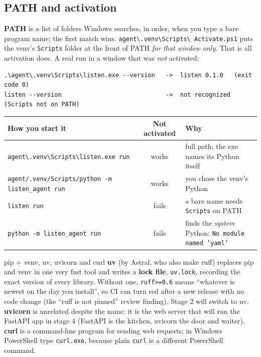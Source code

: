 \documentclass[11pt,a4paper]{article}
\begin{document}
\subsection{PATH and activation}
\textbf{PATH} is a list of folders Windows searches, in order, when you type a bare program name;
the first match wins. \texttt{agent\textbackslash .venv\textbackslash Scripts\textbackslash
Activate.ps1} puts the venv's \texttt{Scripts} folder at the front of PATH \emph{for that window
only}. That is all activation does. A real run in a window that was \emph{not} activated:
\begin{lstlisting}
.\agent\.venv\Scripts\listen.exe --version   ->  listen 0.1.0   (exit code 0)
listen --version                             ->  not recognized (Scripts not on PATH)
\end{lstlisting}
\begin{center}
\begin{tabularx}{\textwidth}{l c X}
\toprule
\textbf{How you start it} & \textbf{Not activated} & \textbf{Why} \\
\midrule
\texttt{agent\textbackslash .venv\textbackslash Scripts\textbackslash listen.exe run} & works & full path; the exe names its Python itself \\
\texttt{agent/.venv/Scripts/python -m listen\_agent run} & works & you chose the venv's Python \\
\texttt{listen run} & fails & a bare name needs \texttt{Scripts} on PATH \\
\texttt{python -m listen\_agent run} & fails & finds the \emph{system} Python: \texttt{No module named 'yaml'} \\
\bottomrule
\end{tabularx}
\end{center}

\begin{concept}{pip + venv, uv, uvicorn and curl}
\textbf{uv} (by Astral, who also make ruff) replaces pip and venv in one very fast tool and writes
a \textbf{lock file}, \texttt{uv.lock}, recording the exact version of every library. Without one,
\texttt{ruff>=0.6} means ``whatever is newest on the day you install'', so CI can turn red after a
new release with no code change (the ``ruff is not pinned'' review finding). Stage 2 will switch
to uv. \textbf{uvicorn} is unrelated despite the name: it is the web server that will run the
FastAPI app in stage 4 (FastAPI is the kitchen, uvicorn the door and waiter).
\textbf{curl} is a command-line program for sending web requests; in Windows PowerShell type
\texttt{curl.exe}, because plain \texttt{curl} is a different PowerShell command.
\end{concept}
\end{document}

